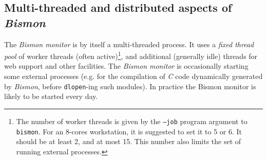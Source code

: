 \subsection{Multi-threaded and distributed aspects of \textit{Bismon}}

The \textit{Bismon monitor} is by itself a multi-threaded process. It
uses a \emph{fixed thread pool} of worker threads (often
active)\footnote{The number of worker threads is given by the
  \texttt{--job} program argument to \texttt{bismon}. For an 8-cores
  workstation, it is suggested to set it to 5 or 6. It should be at
  least 2, and at most 15. This number also limits the set of running
  external processes.}, and additional (generally idle) threads for
web support and other facilities. The \textit{Bismon monitor} is
occasionally starting some external processes (e.g. for the
compilation of \emph{C} code dynamically generated by \textit{Bismon},
before \texttt{dlopen}-ing such modules). In practice the Bismon
monitor is likely to be started every day.
